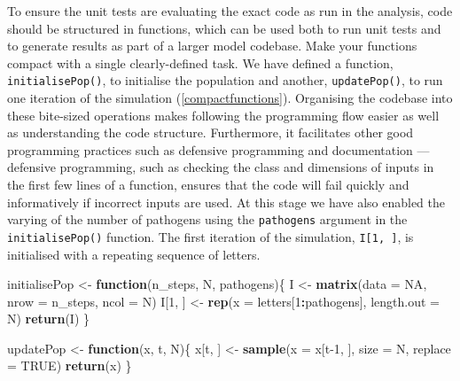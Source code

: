 \documentclass[
]{article}
\newenvironment{Shaded}{\begin{snugshade}}{\end{snugshade}}
\newcommand{\ControlFlowTok}[1]{\textcolor[rgb]{0.13,0.29,0.53}{\textbf{#1}}}
\newcommand{\DataTypeTok}[1]{\textcolor[rgb]{0.13,0.29,0.53}{#1}}
\newcommand{\DecValTok}[1]{\textcolor[rgb]{0.00,0.00,0.81}{#1}}
\newcommand{\KeywordTok}[1]{\textcolor[rgb]{0.13,0.29,0.53}{\textbf{#1}}}
\newcommand{\NormalTok}[1]{#1}
\newcommand{\OperatorTok}[1]{\textcolor[rgb]{0.81,0.36,0.00}{\textbf{#1}}}
\newcommand{\OtherTok}[1]{\textcolor[rgb]{0.56,0.35,0.01}{#1}}
\newcommand{\StringTok}[1]{\textcolor[rgb]{0.31,0.60,0.02}{#1}}
\begin{document}
To ensure the unit tests are evaluating the exact code as run in the analysis, code should be structured in functions, which can be used both to run unit tests and to generate results as part of a larger model codebase.
Make your functions compact with a single clearly-defined task.
We have defined a function, \texttt{initialisePop()}, to initialise the population and another, \texttt{updatePop()}, to run one iteration of the simulation (\ref{compactfunctions}).
Organising the codebase into these bite-sized operations makes following the programming flow easier as well as understanding the code structure.
Furthermore, it facilitates other good programming practices such as defensive programming and documentation --- defensive programming, such as checking the class and dimensions of inputs in the first few lines of a function, ensures that the code will fail quickly and informatively if incorrect inputs are used.
At this stage we have also enabled the varying of the number of pathogens using the \texttt{pathogens} argument in the \texttt{initialisePop()} function.
The first iteration of the simulation, \texttt{I{[}1,\ {]}}, is initialised with a repeating sequence of letters.
\newline
{}\label{compactfunctions}

\begin{Shaded}
\begin{Highlighting}[]
\NormalTok{initialisePop <-}\StringTok{ }\ControlFlowTok{function}\NormalTok{(n_steps, N, pathogens)\{}
\NormalTok{  I <-}\StringTok{ }\KeywordTok{matrix}\NormalTok{(}\DataTypeTok{data =} \OtherTok{NA}\NormalTok{, }\DataTypeTok{nrow =}\NormalTok{ n_steps, }\DataTypeTok{ncol =}\NormalTok{ N)}
\NormalTok{  I[}\DecValTok{1}\NormalTok{, ] <-}\StringTok{ }\KeywordTok{rep}\NormalTok{(}\DataTypeTok{x =}\NormalTok{ letters[}\DecValTok{1}\OperatorTok{:}\NormalTok{pathogens], }\DataTypeTok{length.out =}\NormalTok{ N)}
  \KeywordTok{return}\NormalTok{(I)}
\NormalTok{\}}

\NormalTok{updatePop <-}\StringTok{ }\ControlFlowTok{function}\NormalTok{(x, t, N)\{}
\NormalTok{  x[t, ] <-}\StringTok{ }\KeywordTok{sample}\NormalTok{(}\DataTypeTok{x =}\NormalTok{ x[t}\DecValTok{-1}\NormalTok{, ], }\DataTypeTok{size =}\NormalTok{ N, }\DataTypeTok{replace =} \OtherTok{TRUE}\NormalTok{)}
  \KeywordTok{return}\NormalTok{(x)}
\NormalTok{\}}
\end{Highlighting}
\end{Shaded}
\end{document}

